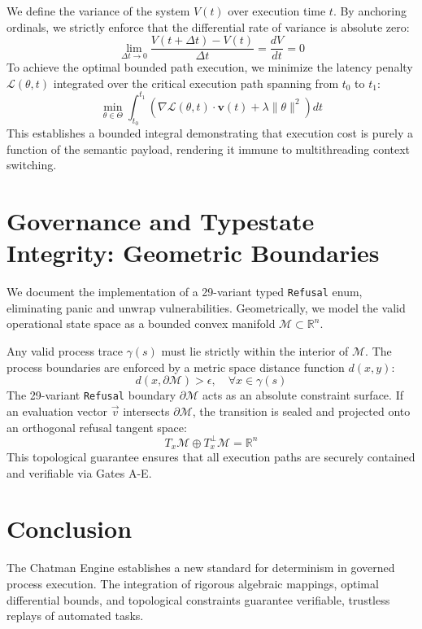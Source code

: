 \documentclass[12pt, a4paper]{report}
\begin{document}
We define the variance of the system $V(t)$ over execution time $t$. By anchoring ordinals, we strictly enforce that the differential rate of variance is absolute zero:
\begin{equation}
\lim_{\Delta t \to 0} \frac{V(t+\Delta t) - V(t)}{\Delta t} = \frac{dV}{dt} = 0
\end{equation}
To achieve the optimal bounded path execution, we minimize the latency penalty $\mathcal{L}(\theta, t)$ integrated over the critical execution path spanning from $t_0$ to $t_1$:
\begin{equation}
\min_{\theta \in \Theta} \int_{t_0}^{t_1} \left( \nabla \mathcal{L}(\theta, t) \cdot \mathbf{v}(t) + \lambda \| \theta \|^2 \right) dt
\end{equation}
This establishes a bounded integral demonstrating that execution cost is purely a function of the semantic payload, rendering it immune to multithreading context switching.

\chapter{Governance and Typestate Integrity: Geometric Boundaries}
We document the implementation of a 29-variant typed \texttt{Refusal} enum, eliminating panic and unwrap vulnerabilities. Geometrically, we model the valid operational state space as a bounded convex manifold $\mathcal{M} \subset \mathbb{R}^n$.

Any valid process trace $\gamma(s)$ must lie strictly within the interior of $\mathcal{M}$. The process boundaries are enforced by a metric space distance function $d(x, y)$:
\begin{equation}
d(x, \partial \mathcal{M}) > \epsilon, \quad \forall x \in \gamma(s)
\end{equation}
The 29-variant \texttt{Refusal} boundary $\partial \mathcal{M}$ acts as an absolute constraint surface. If an evaluation vector $\vec{v}$ intersects $\partial \mathcal{M}$, the transition is sealed and projected onto an orthogonal refusal tangent space:
\begin{equation}
T_x \mathcal{M} \oplus T_x^\perp \mathcal{M} = \mathbb{R}^n
\end{equation}
This topological guarantee ensures that all execution paths are securely contained and verifiable via Gates A-E.

\chapter{Conclusion}
The Chatman Engine establishes a new standard for determinism in governed process execution. The integration of rigorous algebraic mappings, optimal differential bounds, and topological constraints guarantee verifiable, trustless replays of automated tasks.
\end{document}
